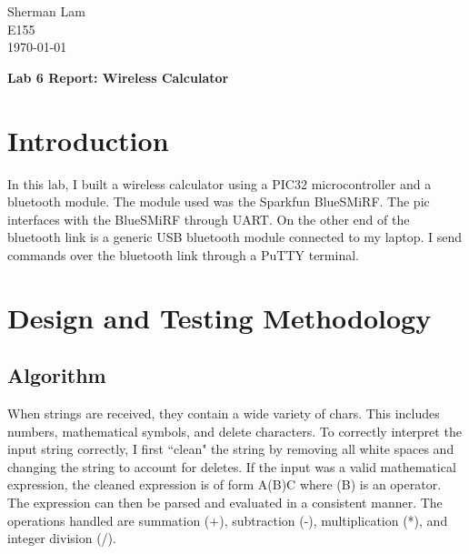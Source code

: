\documentclass[11pt]{article}
\begin{document}
\begin{flushleft}
Sherman Lam
\\E155
\\ \today
\end{flushleft}


\begin{center}
\begin{Large}
\textbf{Lab 6 Report: Wireless Calculator}
\end{Large}
\end{center}




\section{Introduction}

In this lab, I built a wireless calculator using a PIC32 microcontroller and a bluetooth module. The module used was the Sparkfun BlueSMiRF. The pic interfaces with the BlueSMiRF through UART. On the other end of the bluetooth link is a generic USB bluetooth module connected to my laptop. I send commands over the bluetooth link through a PuTTY terminal.


\section{Design and Testing Methodology}

\subsection{Algorithm}

When strings are received, they contain a wide variety of chars. This includes numbers, mathematical symbols, and delete characters. To correctly interpret the input string correctly, I first ``clean" the string by removing all white spaces and changing the string to account for deletes. If the input was a valid mathematical expression, the cleaned expression is of form A(B)C where (B) is an operator. The expression can then be parsed and evaluated in a consistent manner. The operations handled are summation (+), subtraction (-), multiplication (*), and integer division (/).
\end{document}
